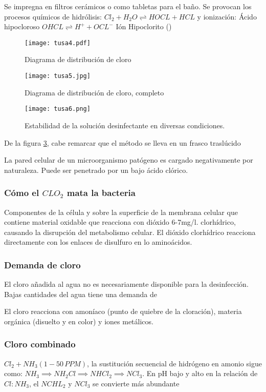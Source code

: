 Se impregna en filtros cerámicos o como tabletas para el baño.
Se provocan los procesos químicos de hidrólisis: $Cl_2+H_2O\rightleftharpoons HOCL+HCL $ y ionización: Ácido hipocloroso $OHCL\rightleftharpoons H^++OCL^-$ Ión Hipoclorito ()
\begin{figure}[h!]
\centering
  \texttt{[image: tusa4.pdf]}
  \caption{Diagrama de distribución de cloro}
  \label{tusa4}
\end{figure}
\begin{figure}[h!]
\centering
  \texttt{[image: tusa5.jpg]}
  \caption{Diagrama de distribución de cloro, completo}
  \label{tusa5}
\end{figure}
\begin{figure}[h!]
\centering
  \texttt{[image: tusa6.png]}
  \caption{Estabilidad de la solución desinfectante en diversas condiciones.}
  \label{tusa6}
\end{figure}
De la figura \ref{tusa6}, cabe remarcar que el método se lleva en un frasco traslúcido

La pared celular de un microorganismo patógeno es cargado negativamente por naturaleza. Puede ser penetrado por un bajo ácido clórico.

\subsubsection{Cómo el $CLO_2$ mata la bacteria}
Componentes de la célula y sobre la superficie de la membrana celular que contiene material oxidable que reacciona con dióxido 6-7mg/l. clorhídrico, causando la disrupción del metabolismo celular. El dióxido clorhídrico reacciona directamente con los enlaces de disulfuro en lo aminoácidos.

\subsubsection{Demanda de cloro}
El cloro añadida al agua no es necesariamente disponible para la desinfección. Bajas cantidades del agua tiene una demanda de 

El cloro reacciona con amoníaco (punto de quiebre de la cloración), materia orgánica (disuelto y en color) y iones metálicos.

\subsubsection{Cloro combinado}
$Cl_2+NH_3(1-50\,PPM)$, la sustitución secuencial de hidrógeno en amonio sigue como:
$NH_3\implies NH_2Cl\implies NHCl_2\implies NCl_3$. En pH bajo y alto en la relación de $Cl: NH_3$, el $NCHL_2$ y $NCl_3$ se convierte más abundante

